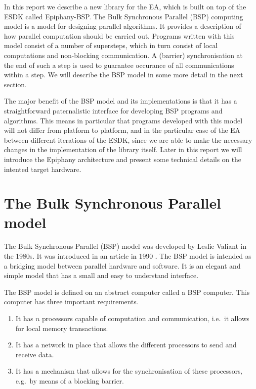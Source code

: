 \documentclass[fleqn]{article}
\renewcommand{\(}{\left(}
\renewcommand{\)}{\right)}
\begin{document}
In this report we describe a new library for the EA, which is built on top of the ESDK called Epiphany-BSP. The Bulk Synchronous Parallel (BSP) computing model is a model for designing parallel algorithms. It provides a description of how parallel computation should be carried out. Programs written with this model consist of a number of supersteps, which in turn consist of local computations and non-blocking communication. A (barrier) synchronisation at the end of such a step is used to guarantee occurance of all communications within a step. We will describe the BSP model in some more detail in the next section. 

The major benefit of the BSP model and its implementations is that it has a straightforward paternalistic interface for developing BSP programs and algorithms. This means in particular that programs developed with this model will not differ from platform to platform, and in the particular case of the EA between different iterations of the ESDK, since we are able to make the necessary changes in the implementation of the library itself. Later in this report we will introduce the Epiphany architecture and present some technical details on the intented target hardware.

\section{The Bulk Synchronous Parallel model}

The Bulk Synchronous Parallel (BSP) model was developed by Leslie Valiant in the 1980s. It was introduced in an article in 1990 \cite{bsp:valiant}. The BSP model is intended as a bridging model between parallel hardware and software. It is an elegant and simple model that has a small and easy to understand interface.

The BSP model is defined on an abstract computer called a BSP computer. This computer has three important requirements.
\begin{enumerate}[1.]
\item It has $n$ processors capable of computation and communication, i.e.\ it allows for local memory transactions.
\item It has a network in place that allows the different processors to send and receive data.
\item It has a mechanism that allows for the synchronisation of these processors, e.g.\ by means of a blocking barrier.
\end{enumerate}
\end{document}
